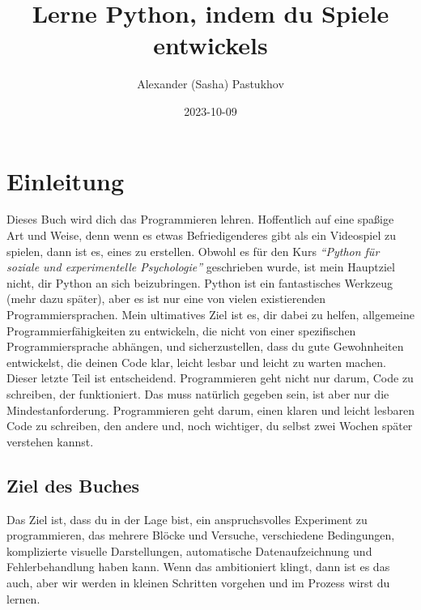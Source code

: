 \documentclass[
]{book}
\title{Lerne Python, indem du Spiele entwickels}
\author{Alexander (Sasha) Pastukhov}
\date{2023-10-09}
\begin{document}
\maketitle

{
\setcounter{tocdepth}{1}
\tableofcontents
}
\hypertarget{intro}{%
\chapter{Einleitung}\label{intro}}

Dieses Buch wird dich das Programmieren lehren. Hoffentlich auf eine spaßige Art und Weise, denn wenn es etwas Befriedigenderes gibt als ein Videospiel zu spielen, dann ist es, eines zu erstellen. Obwohl es für den Kurs \emph{``Python für soziale und experimentelle Psychologie''} geschrieben wurde, ist mein Hauptziel nicht, dir Python an sich beizubringen. Python ist ein fantastisches Werkzeug (mehr dazu später), aber es ist nur eine von vielen existierenden Programmiersprachen. Mein ultimatives Ziel ist es, dir dabei zu helfen, allgemeine Programmierfähigkeiten zu entwickeln, die nicht von einer spezifischen Programmiersprache abhängen, und sicherzustellen, dass du gute Gewohnheiten entwickelst, die deinen Code klar, leicht lesbar und leicht zu warten machen. Dieser letzte Teil ist entscheidend. Programmieren geht nicht nur darum, Code zu schreiben, der funktioniert. Das muss natürlich gegeben sein, ist aber nur die Mindestanforderung. Programmieren geht darum, einen klaren und leicht lesbaren Code zu schreiben, den andere und, noch wichtiger, du selbst zwei Wochen später verstehen kannst.

\hypertarget{ziel-des-buches}{%
\section{Ziel des Buches}\label{ziel-des-buches}}

Das Ziel ist, dass du in der Lage bist, ein anspruchsvolles Experiment zu programmieren, das mehrere Blöcke und Versuche, verschiedene Bedingungen, komplizierte visuelle Darstellungen, automatische Datenaufzeichnung und Fehlerbehandlung haben kann. Wenn das ambitioniert klingt, dann ist es das auch, aber wir werden in kleinen Schritten vorgehen und im Prozess wirst du lernen.
\end{document}
